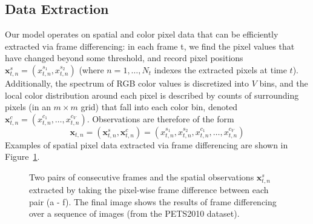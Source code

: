 \documentclass{article}
\begin{document}
\subsection{Data Extraction}
Our model operates on spatial and color pixel data that can be efficiently extracted via frame differencing: in each frame t, we find the pixel values that have changed beyond some threshold, and record pixel positions $\mathbf{x}^s_{t,n} = (x^{s_1}_{t,n}, x^{s_2}_{t,n})$ (where $n=1,\ldots,N_t$ indexes the extracted pixels at time $t$). Additionally, the spectrum of RGB color values is discretized into $V$ bins, and the local color distribution around each pixel is described by counts of surrounding pixels (in an $m \times m$ grid) that fall into each color bin, denoted $\mathbf{x}^c_{t,n} = (x^{c_1}_{t,n},\ldots,x^{c_{V}}_{t,n})$. Observations are therefore of the form
\begin{equation}
    \mathbf{x}_{t,n} = (\mathbf{x}^s_{t,n},\mathbf{x}^c_{t,n}) = (x^{s_1}_{t,n},x^{s_2}_{t,n},x^{c_1}_{t,n},\ldots,x^{c_{V}}_{t,n})
\end{equation}
Examples of spatial pixel data extracted via frame differencing are shown in Figure~\ref{fig:fig01}.
\begin{figure}[h]
        \caption{\label{fig:fig01} Two pairs of consecutive frames and the spatial observations $\mathbf{x}_{t,n}^s$ extracted by taking the pixel-wise frame difference between each pair (a - f). The final image shows the results of frame differencing over a sequence of images (from the PETS2010 dataset).}
\end{figure}
\end{document}
